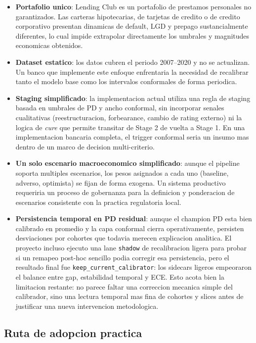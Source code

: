 \documentclass[
  spanish,
  11pt,
  letterpaper,
]{scrbook}
\providecommand{\tightlist}{%
  \setlength{\itemsep}{0pt}\setlength{\parskip}{0pt}}
\theoremstyle{plain}
\theoremstyle{remark}
\begin{document}
\begin{itemize}
\tightlist
\item
  \textbf{Portafolio unico}: Lending Club es un portafolio de prestamos
  personales no garantizados. Las carteras hipotecarias, de tarjetas de
  credito o de credito corporativo presentan dinamicas de default, LGD y
  prepago sustancialmente diferentes, lo cual impide extrapolar
  directamente los umbrales y magnitudes economicas obtenidos.
\item
  \textbf{Dataset estatico}: los datos cubren el periodo 2007--2020 y no
  se actualizan. Un banco que implemente este enfoque enfrentaria la
  necesidad de recalibrar tanto el modelo base como los intervalos
  conformales de forma periodica.
\item
  \textbf{Staging simplificado}: la implementacion actual utiliza una
  regla de staging basada en umbrales de PD y ancho conformal, sin
  incorporar senales cualitativas (reestructuracion, forbearance, cambio
  de rating externo) ni la logica de \emph{cure} que permite transitar
  de Stage 2 de vuelta a Stage 1. En una implementacion bancaria
  completa, el trigger conformal seria un insumo mas dentro de un marco
  de decision multi-criterio.
\item
  \textbf{Un solo escenario macroeconomico simplificado}: aunque el
  pipeline soporta multiples escenarios, los pesos asignados a cada uno
  (baseline, adverso, optimista) se fijan de forma exogena. Un sistema
  productivo requeriria un proceso de gobernanza para la definicion y
  ponderacion de escenarios consistente con la practica regulatoria
  local.
\item
  \textbf{Persistencia temporal en PD residual}: aunque el champion PD
  esta bien calibrado en promedio y la capa conformal cierra
  operativamente, persisten desviaciones por cohortes que todavia
  merecen explicacion analitica. El proyecto incluso ejecuto una lane
  \texttt{shadow} de recalibracion ligera para probar si un remapeo
  post-hoc sencillo podia corregir esa persistencia, pero el resultado
  final fue \texttt{keep\_current\_calibrator}: los sidecars ligeros
  empeoraron el balance entre gap, estabilidad temporal y ECE. Esto
  acota bien la limitacion restante: no parece faltar una correccion
  mecanica simple del calibrador, sino una lectura temporal mas fina de
  cohortes y slices antes de justificar una nueva intervencion
  metodologica.
\end{itemize}

\subsection{Ruta de adopcion practica}\label{sec-p2-adoption}
\end{document}
